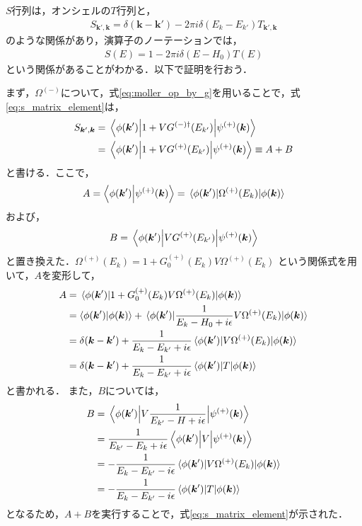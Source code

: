 \documentclass[a4paper,11pt]{ltjsarticle}
\numberwithin{equation}{section}
\begin{document}
$S$行列は，オンシェルの$T$行列と， 
\begin{align}\label{eq:s_matrix_by_t}
  S_{\bm{k}', \bm{k}} = \delta(\bm{k} - \bm{k}') - 2 \pi i \delta(E_k - E_{k'}) T_{\bm{k}', \bm{k}}
\end{align}
のような関係があり，演算子のノーテーションでは，
\begin{align}
  S(E) = 1 - 2\pi i \delta(E-H_0) T(E)
\end{align}
という関係があることがわかる．以下で証明を行おう．

まず，$\Omega^{(-)}$について，式\ref{eq:moller_op_by_g}を用いることで，式\ref{eq:s_matrix_element}は，
\begin{align}\label{eq:S_matrix_by_g}
  S_{\bm{k}', \bm{k}} &= \mel{\phi(\bm{k}')}{1+VG^{(-)\dagger}(E_{k'})}{\psi^{(+)}(\bm{k})} \notag \\
  &= \mel{\phi(\bm{k}')}{1+VG^{(+)}(E_{k'})}{\psi^{(+)}(\bm{k})} \equiv A + B
\end{align}
と書ける．ここで，
\begin{align}
  A = \braket{\phi(\bm{k}')}{\psi^{(+)}(\bm{k})} = \mel{\phi(\bm{k}')}{\Omega^{(+)}(E_k)}{\phi(\bm{k})}
\end{align}
および，
\begin{align}
  B = \mel{\phi(\bm{k}')}{VG^{(+)}(E_{k'})}{\psi^{(+)}(\bm{k})}
\end{align}
と置き換えた．$\Omega^{(+)}(E_k) = 1 + G_0^{(+)}(E_k)V\Omega^{(+)}(E_k)$
という関係式を用いて，$A$を変形して，
\begin{align}
  A 
  &= \mel{\phi(\bm{k}')}{1 + G_0^{(+)}(E_{k})V\Omega^{(+)}(E_{k})}{\phi(\bm{k})} \notag \\
  &= \braket{\phi(\bm{k}')}{\phi(\bm{k})} + \mel{\phi(\bm{k}')}{\frac{1}{E_k - H_0 + i\epsilon}V\Omega^{(+)}(E_k)}{\phi(\bm{k})}  \notag \\
  &= \delta(\bm{k}-\bm{k}') + \frac{1}{E_k - E_{k'} + i\epsilon}\mel{\phi(\bm{k}')}{V\Omega^{(+)}(E_k)}{\phi(\bm{k})} \notag \\
  &= \delta(\bm{k}-\bm{k}') + \frac{1}{E_k - E_{k'} + i\epsilon}\mel{\phi(\bm{k}')}{T}{\phi(\bm{k})} 
\end{align}
と書かれる．
また，$B$については，
\begin{align}
  B 
  &= \mel{\phi(\bm{k}')}{V \frac{1}{E_{k'} - H + i\epsilon}}{\psi^{(+)}(\bm{k})} \notag \\
  &= \frac{1}{E_{k'} - E_k + i\epsilon} \mel{\phi(\bm{k}')}{V}{\psi^{(+)}(\bm{k})} \notag \\
  &= - \frac{1}{E_k - E_{k'} - i \epsilon} \mel{\phi(\bm{k}')}{V \Omega^{(+)}(E_k)}{\phi(\bm{k})} \notag \\
  &= - \frac{1}{E_k - E_{k'} - i \epsilon} \mel{\phi(\bm{k}')}{T}{\phi(\bm{k})} 
\end{align}
となるため，$A+B$を実行することで，式\ref{eq:s_matrix_element}が示された．
\end{document}
